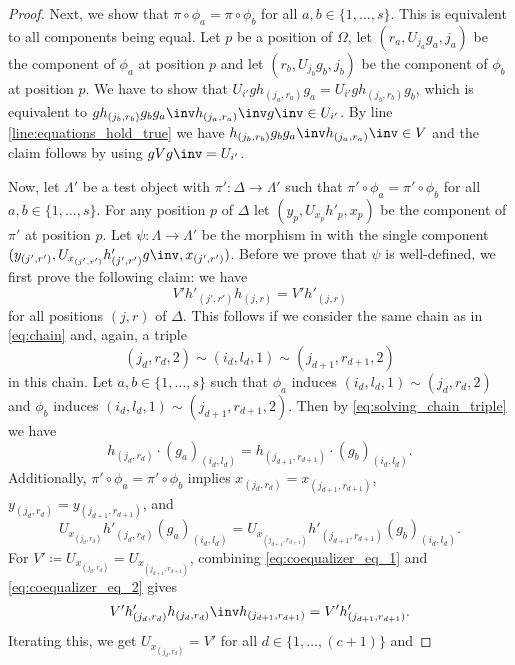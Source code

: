 \begin{proof}
Next, we show that $\pi \circ \phi_a = \pi \circ \phi_b$ for all $a,b \in \{1,\dots,s\}$. This is equivalent to all components being equal. Let $p$ be a position of $\Omega$, let $(r_a,U_{j_a}g_a,j_a)$ be the component of $\phi_a$ at position $p$ and let $(r_b,U_{j_b}g_b,j_b)$ be the component of $\phi_b$ at position $p$. We have to show that $U_{i'}gh_{(j_a,r_a)}g_a = U_{i'}gh_{(j_b,r_b)}g_b$, which is equivalent to $gh_{(j_b,r_b)}g_b g_a\inv h_{(j_a,r_a)}\inv g\inv \in U_{i'}$. By line \ref{line:equations_hold_true} we have $h_{(j_b,r_b)}g_b g_a\inv h_{(j_a,r_a)}\inv \in V$ and the claim follows by using $gVg\inv = U_{i'}$.

Now, let $\Lambda'$ be a test object with $\pi'\colon\Delta \to \Lambda'$ such that $\pi' \circ \phi_a = \pi' \circ \phi_b$ for all $a,b \in \{1,\dots,s\}$. For any position $p$ of $\Delta$ let $(y_p,U_{x_p}h'_p,x_p)$ be the component of $\pi'$ at position $p$. Let $\psi\colon\Lambda \to \Lambda'$ be the morphism in \SkeletalGSets{} with the single component $(y_{(j',r')},U_{x_{(j',r')}}h'_{(j',r')} g\inv,x_{(j',r')})$. Before we prove that $\psi$ is well-defined, we first prove the following claim: we have
\begin{equation}
V' h'_{(j',r')}h_{(j,r)} = V'h'_{(j,r)}\label{eq:main_claim}
\end{equation}
for all positions $(j,r)$ of $\Delta$. This follows if we consider the same chain as in \eqref{eq:chain} and, again, a triple \[(j_d,r_d,2) \sim (i_d,l_d,1) \sim (j_{d+1},r_{d+1},2)\] in this chain. Let $a,b \in \{1,\dots,s\}$ such that $\phi_a$ induces $(i_d,l_d,1) \sim (j_d,r_d,2)$ and $\phi_b$ induces $(i_d,l_d,1) \sim (j_{d+1},r_{d+1},2)$. Then by \eqref{eq:solving_chain_triple} we have
\begin{equation}
h_{(j_d,r_d)} \cdot (g_a)_{(i_d,l_d)} = h_{(j_{d+1},r_{d+1})} \cdot (g_b)_{(i_d,l_d)}.\label{eq:coequalizer_eq_1}
\end{equation}
Additionally, $\pi' \circ \phi_a = \pi' \circ \phi_b$ implies $x_{(j_d,r_d)} = x_{(j_{d+1},r_{d+1})}$, $y_{(j_d,r_d)} = y_{(j_{d+1},r_{d+1})}$, and
\begin{equation}
U_{x_{(j_d,r_d)}} h'_{(j_d,r_d)} (g_a)_{(i_d,l_d)} = U_{x_{(j_{d+1},r_{d+1})}} h'_{(j_{d+1},r_{d+1})} (g_b)_{(i_d,l_d)}.\label{eq:coequalizer_eq_2}
\end{equation}
For $V' \coloneqq U_{x_{(j_d,r_d)}} = U_{x_{(j_{d+1},r_{d+1})}}$, combining \eqref{eq:coequalizer_eq_1} and \eqref{eq:coequalizer_eq_2} gives \[V'h'_{(j_d,r_d)} h_{(j_d,r_d)}\inv h_{(j_{d+1},r_{d+1})} = V'h'_{(j_{d+1},r_{d+1})}.\] Iterating this, we get $U_{x_{(j_d,r_d)}} = V'$ for all $d \in \{1,\dots,(c+1)\}$ and

\end{proof}
